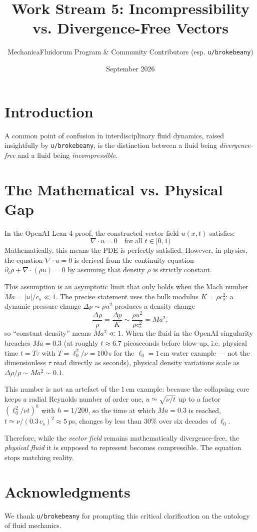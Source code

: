 \documentclass[11pt]{article}
\title{Work Stream 5: Incompressibility vs. Divergence-Free Vectors}
\author{MechanicaFluidorum Program \& Community Contributors (esp. \texttt{u/brokebeany})}
\date{September 2026}
\begin{document}
\maketitle

\section{Introduction}
A common point of confusion in interdisciplinary fluid dynamics, raised insightfully by \texttt{u/brokebeany}, is the distinction between a fluid being \emph{divergence-free} and a fluid being \emph{incompressible}.

\section{The Mathematical vs. Physical Gap}
In the OpenAI Lean 4 proof, the constructed vector field $u(x,t)$ satisfies:
\begin{equation}
    \nabla \cdot u = 0 \quad \text{for all } t \in [0, 1)
\end{equation}
Mathematically, this means the PDE is perfectly satisfied. However, in physics, the equation $\nabla \cdot u = 0$ is derived from the continuity equation $\partial_t \rho + \nabla \cdot (\rho u) = 0$ by assuming that density $\rho$ is strictly constant.

This assumption is an asymptotic limit that only holds when the Mach number $Ma = |u|/c_s \ll 1$. The precise statement uses the bulk modulus $K = \rho c_s^2$: a dynamic pressure change $\Delta p \sim \rho u^2$ produces a density change
\begin{equation}
    \frac{\Delta \rho}{\rho} = \frac{\Delta p}{K} \sim \frac{\rho u^2}{\rho c_s^2} = Ma^2 ,
\end{equation}
so ``constant density'' means $Ma^2 \ll 1$. When the fluid in the OpenAI singularity breaches $Ma = 0.3$ (at roughly $t \approx 6.7$ picoseconds before blow-up, i.e. physical time $t = T\tau$ with $T = \ell_0^2/\nu = 100$\,s for the $\ell_0=1$\,cm water example --- not the dimensionless $\tau$ read directly as seconds), physical density variations scale as $\Delta \rho / \rho \sim Ma^2 \sim 0.1$.

This number is not an artefact of the $1$\,cm example: because the collapsing core keeps a radial Reynolds number of order one, $u \simeq \sqrt{\nu/t}$ up to a factor $(\ell_0^2/\nu t)^{h}$ with $h=1/200$, so the time at which $Ma = 0.3$ is reached, $t \simeq \nu/(0.3\,c_s)^2 \approx 5$\,ps, changes by less than $30\%$ over six decades of $\ell_0$.

Therefore, while the \emph{vector field} remains mathematically divergence-free, the \emph{physical fluid} it is supposed to represent becomes compressible. The equation stops matching reality.

\section{Acknowledgments}
We thank \texttt{u/brokebeany} for prompting this critical clarification on the ontology of fluid mechanics.
\end{document}
